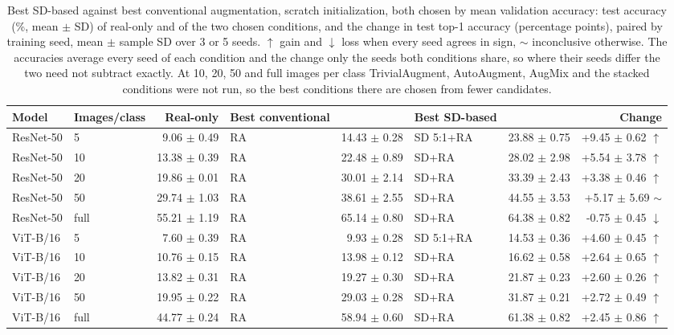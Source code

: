 \begin{table}[H]
\centering
\small
\setlength{\tabcolsep}{4pt}
\caption{Best SD-based against best conventional augmentation, scratch initialization, both chosen by mean validation accuracy: test accuracy (\%, mean $\pm$ SD) of real-only and of the two chosen conditions, and the change in test top-1 accuracy (percentage points), paired by training seed, mean $\pm$ sample SD over 3 or 5 seeds. $\uparrow$ gain and $\downarrow$ loss when every seed agrees in sign, $\sim$ inconclusive otherwise. The accuracies average every seed of each condition and the change only the seeds both conditions share, so where their seeds differ the two need not subtract exactly. At 10, 20, 50 and full images per class TrivialAugment, AutoAugment, AugMix and the stacked conditions were not run, so the best conditions there are chosen from fewer candidates.}
\label{tab:augment-best-scratch-test}
\begin{tabular}{llrlrlrr}
\toprule
Model & Images/class & Real-only & Best conventional & & Best SD-based & & Change \\
\midrule
ResNet-50 & 5 & 9.06 $\pm$ 0.49 & RA & 14.43 $\pm$ 0.28 & SD 5:1+RA & 23.88 $\pm$ 0.75 & +9.45 $\pm$ 0.62 $\uparrow$ \\
ResNet-50 & 10 & 13.38 $\pm$ 0.39 & RA & 22.48 $\pm$ 0.89 & SD+RA & 28.02 $\pm$ 2.98 & +5.54 $\pm$ 3.78 $\uparrow$ \\
ResNet-50 & 20 & 19.86 $\pm$ 0.01 & RA & 30.01 $\pm$ 2.14 & SD+RA & 33.39 $\pm$ 2.43 & +3.38 $\pm$ 0.46 $\uparrow$ \\
ResNet-50 & 50 & 29.74 $\pm$ 1.03 & RA & 38.61 $\pm$ 2.55 & SD+RA & 44.55 $\pm$ 3.53 & +5.17 $\pm$ 5.69 $\sim$ \\
ResNet-50 & full & 55.21 $\pm$ 1.19 & RA & 65.14 $\pm$ 0.80 & SD+RA & 64.38 $\pm$ 0.82 & -0.75 $\pm$ 0.45 $\downarrow$ \\
ViT-B/16 & 5 & 7.60 $\pm$ 0.39 & RA & 9.93 $\pm$ 0.28 & SD 5:1+RA & 14.53 $\pm$ 0.36 & +4.60 $\pm$ 0.45 $\uparrow$ \\
ViT-B/16 & 10 & 10.76 $\pm$ 0.15 & RA & 13.98 $\pm$ 0.12 & SD+RA & 16.62 $\pm$ 0.58 & +2.64 $\pm$ 0.65 $\uparrow$ \\
ViT-B/16 & 20 & 13.82 $\pm$ 0.31 & RA & 19.27 $\pm$ 0.30 & SD+RA & 21.87 $\pm$ 0.23 & +2.60 $\pm$ 0.26 $\uparrow$ \\
ViT-B/16 & 50 & 19.95 $\pm$ 0.22 & RA & 29.03 $\pm$ 0.28 & SD+RA & 31.87 $\pm$ 0.21 & +2.72 $\pm$ 0.49 $\uparrow$ \\
ViT-B/16 & full & 44.77 $\pm$ 0.24 & RA & 58.94 $\pm$ 0.60 & SD+RA & 61.38 $\pm$ 0.82 & +2.45 $\pm$ 0.86 $\uparrow$ \\
\bottomrule
\end{tabular}
\end{table}
